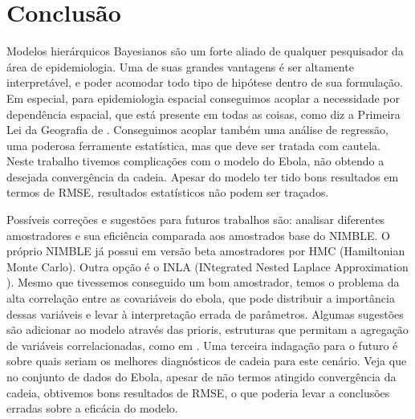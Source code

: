 \chapter{Conclusão}

Modelos hierárquicos Bayesianos são um forte aliado de qualquer pesquisador da área de epidemiologia. Uma de suas grandes vantagens é ser altamente interpretável, e poder acomodar todo tipo de hipótese dentro de sua formulação. Em especial, para epidemiologia espacial conseguimos acoplar a necessidade por dependência espacial, que está presente em todas as coisas, como diz a Primeira Lei da Geografia de \cite{Tobler1970}. Conseguimos acoplar também uma análise de regressão, uma poderosa ferramente estatística, mas que deve ser tratada com cautela. Neste trabalho tivemos complicações com o modelo do Ebola, não obtendo a desejada convergência da cadeia. Apesar do modelo ter tido bons resultados em termos de RMSE, resultados estatísticos não podem ser traçados. 

Possíveis correções e sugestões para futuros trabalhos são: analisar diferentes amostradores e sua eficiência comparada aos amostrados base do NIMBLE. O próprio NIMBLE já possui em versão beta amostradores por HMC (Hamiltonian Monte Carlo). Outra opção é o INLA (INtegrated Nested Laplace Approximation ). Mesmo que tivessemos conseguido um bom amostrador, temos o problema da alta correlação entre as covariáveis do ebola, que pode distribuir a importância dessas variáveis e levar à interpretação errada de parâmetros. Algumas sugestões são adicionar ao modelo através das prioris, estruturas que permitam a agregação de variáveis correlacionadas, como em \cite{IsingDP}. Uma terceira indagação para o futuro é sobre quais seriam os melhores diagnósticos de cadeia para este cenário. Veja que no conjunto de dados do Ebola, apesar de não termos atingido convergência da cadeia, obtivemos bons resultados de RMSE, o que poderia levar a conclusões erradas sobre a eficácia do modelo. 